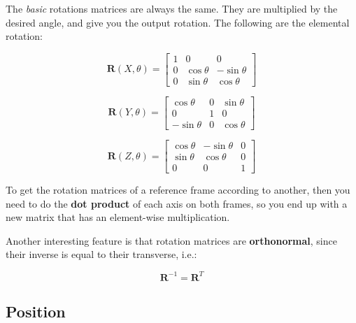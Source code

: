 \documentclass[titlepage, letterpaper, fleqn]{article}
\let\bs\mathbf
\begin{document}
The \textit{basic} rotations matrices are always the same.
They are multiplied by the desired angle, and give you the output rotation.
The following are the elemental rotation:

\begin{equation}
    \label{eq:rot_x}
    \bs{R}(X,\theta) =
    \begin{bmatrix}
        1 & 0 & 0 \\
        0 & \cos \theta & - \sin \theta \\
        0 & \sin \theta & \cos \theta
    \end{bmatrix}
\end{equation}

\begin{equation}
    \label{eq:rot_y}
    \bs{R}(Y,\theta) =
    \begin{bmatrix}
        \cos \theta & 0 & \sin \theta \\
        0 & 1 & 0 \\
        - \sin \theta & 0 & \cos \theta
    \end{bmatrix}
\end{equation}

\begin{equation}
    \label{eq:rot_z}
    \bs{R}(Z,\theta) =
    \begin{bmatrix}
        \cos \theta & - \sin \theta & 0 \\
        \sin \theta & \cos \theta & 0 \\
        0 & 0 & 1
    \end{bmatrix}
\end{equation}

To get the rotation matrices of a reference frame according to another,
then you need to do the \textbf{dot product} of each axis on both frames,
so you end up with a new matrix that has an element-wise multiplication.

Another interesting feature is that rotation matrices are \textbf{orthonormal}, since their inverse is equal to their transverse, i.e.:

\begin{equation}
    \label{eq:ortho}
    \bs{R}^{-1} = \bs{R}^T
\end{equation}


\subsection{Position} %
\label{sec:position}
\end{document}
